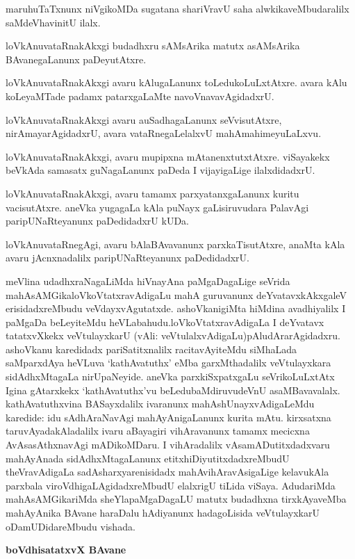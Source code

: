 maruhuTaTxnunx niVgikoMDa sugatana shariVravU saha alwkikaveMbudaralilx saMdeVhavinitU ilalx.

loVkAnuvataRnakAkxgi budadhxru sAMsArika matutx asAMsArika BAvanegaLanunx paDeyutAtxre.

loVkAnuvataRnakAkxgi avaru kAlugaLanunx toLedukoLuLxtAtxre. avara kAlu koLeyaMTade padamx patarxgaLaMte navoVnavavAgidadxrU.

loVkAnuvataRnakAkxgi avaru auSadhagaLanunx seVvisutAtxre, nirAmayarAgidadxrU, avara vataRnegaLelalxvU mahAmahimeyuLaLxvu.

loVkAnuvataRnakAkxgi, avaru mupipxna mAtanenxtutxtAtxre. viSayakekx beVkAda samasatx guNagaLanunx paDeda I vijayigaLige ilalxdidadxrU.

loVkAnuvataRnakAkxgi, avaru tamamx parxyatanxgaLanunx kuritu vacisutAtxre. aneVka yugagaLa kAla puNayx gaLisiruvudara PalavAgi paripUNaRteyanunx paDedidadxrU kUDa.

loVkAnuvataRnegAgi, avaru bAlaBAvavanunx parxkaTisutAtxre, anaMta kAla avaru jAcnxnadalilx paripUNaRteyanunx paDedidadxrU.

meVlina udadhxraNagaLiMda hiVnayAna paMgaDagaLige seVrida mahAsAMGika\break loVkoVtatxravAdigaLu mahA guruvanunx deYvatavxkAkxgaleV erisidadxreMbudu veVdayx\-vAgu\-tatxde. ashoVkanigiMta hiMdina avadhiyalilx I paMgaDa beLeyiteMdu heVLabahudu.\break loVkoVtatxravAdigaLa I deYvatavx tatatxvXkekx veVtulayxkarU (vAli: veVtulalxvAdigaLu)\break pAludArarAgidadxru. ashoVkanu karedidadx pariSatitxnalilx racitavAyiteMdu siMha\-Lada saMparxdAya heVLuva `kathAvatuthx' eMba garxMthadalilx veVtulayxkara sidAdhxMtagaLa nirU\-paNeyide. aneVka parxkiSxpatxgaLu seVrikoLuLxtAtx Igina gAtarxkekx `kathAvatuthx'vu beLedubaMdiruvudeVnU asaMBavavalalx. kathAvatuthxvina BASayxdalilx ivaranunx mahAshUnayxvAdigaLeMdu karedide: idu sAdhAraNavAgi mahAyAnigaLanunx kurita mAtu. kirxsatxna taruvAyada\break kAladalilx ivaru aBayagiri vihAravanunx tamamx mecicxna AvAsasAthxnavAgi mADi\break\-koMDaru. I vihAradalilx vAsamADutitxdadxvaru mahAyAnada sidAdhxMtagaLanunx etitx\-hiDiyutitxdadxreMbudU theVravAdigaLa sadAsharxyarenisidadx mahAvihAravAsigaLige kelavu\-kAla parxbala viroVdhigaLAgidadxreMbudU elalxrigU tiLida viSaya. AdudariMda mahA\-sAMGikariMda sheYlapaMgaDagaLU matutx budadhxna tirxkAyaveMba mahAyAnika BAvane haraDalu hAdiyanunx hadagoLisida veVtulayxkarU oDamUDidareMbudu vishada.

\begin{center}
{\textbf{\Large boVdhisatatxvX BAvane}}
\end{center}

